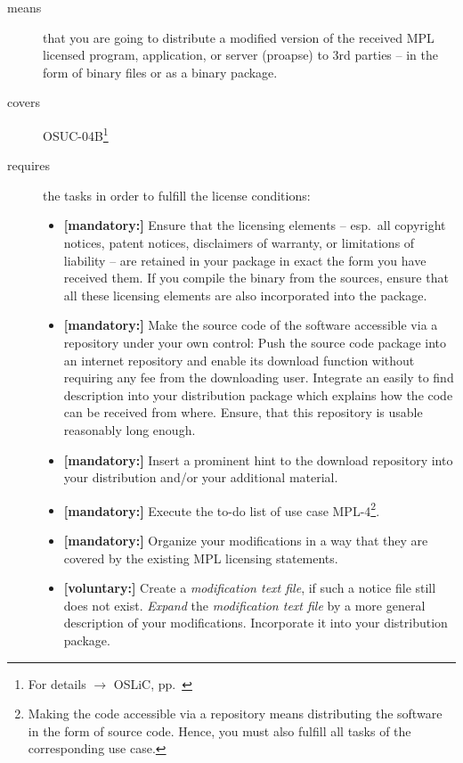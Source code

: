 \begin{description}
\item[means] that you are going to distribute a modified version of the received
MPL licensed pro\-gram, application, or server (proapse) to 3rd parties -- in
the form of binary files or as a binary package.
\item[covers] OSUC-04B\footnote{For details $\rightarrow$ OSLiC, pp.\
\pageref{OSUC-04B-DEF}}
\item[requires] the tasks in order to fulfill the license conditions:
\begin{itemize}

  \item \textbf{[mandatory:]} Ensure that the licensing elements -- esp.\ all
  copyright notices, patent notices, disclaimers of warranty, or limitations of
  liability -- are retained in your package in exact the form you have received
  them. If you compile the binary from the sources, ensure that all these
  licensing elements are also incorporated into the package.

  \item \textbf{[mandatory:]} Make the source code of the software accessible
  via a repository under your own control: Push the source code package into an
  internet repository and enable its download function without requiring any fee
  from the downloading user. Integrate an easily to find description into your
  distribution package which explains how the code can be received from where.
  Ensure, that this repository is usable reasonably long enough.
  
  \item \textbf{[mandatory:]} Insert a prominent hint to the download repository
  into your distribution and/or your additional material. 

  \item \textbf{[mandatory:]} Execute the to-do list of use case MPL-4\footnote{
  Making the code accessible via a repository means distributing the software in
  the form of source code. Hence, you must also fulfill all tasks of the
  corresponding use case.}.

  \item \textbf{[mandatory:]} Organize your modifications in a way that they are
  covered by the existing MPL licensing statements.
  
  \item \textbf{[voluntary:]} Create a \emph{modification text file}, if such a
  notice file still does not exist. \emph{Expand} the \emph{modification text
  file} by a more general description of your modifications. Incorporate it into
  your distribution package.
  

\end{itemize}
\end{description}
